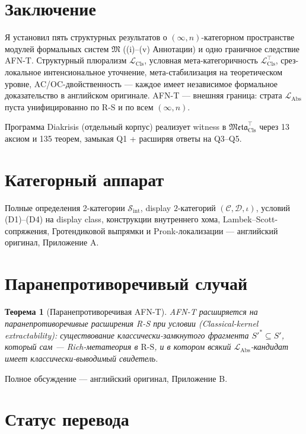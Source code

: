 \documentclass[11pt]{article}
\theoremstyle{plain}
\newtheorem{theorem}{Теорема}[section]
\theoremstyle{definition}
\newcommand{\RS}{\mathrm{R\text{-}S}}
\newcommand{\cS}{\mathcal{S}}
\newcommand{\cC}{\mathcal{C}}
\newcommand{\cD}{\mathcal{D}}
\newcommand{\fM}{\mathfrak{M}}
\newcommand{\Meta}{\mathfrak{Meta}}
\newcommand{\LCls}{\mathcal{L}_{\mathrm{Cls}}}
\newcommand{\LClsMax}{\mathcal{L}_{\mathrm{Cls}}^{\top}}
\newcommand{\LAbs}{\mathcal{L}_{\mathrm{Abs}}}
\newcommand{\Sint}{\cS_{\mathrm{int}}}
\begin{document}
\section{Заключение}\label{sec:conclusion}

Я установил пять структурных результатов о $(\infty, n)$-категорном пространстве модулей формальных систем $\fM$ ((i)--(v) Аннотации) и одно граничное следствие AFN-T. Структурный плюрализм $\LCls$, условная мета-категоричность $\LClsMax$, срез-локальное интенсиональное уточнение, мета-стабилизация на теоретическом уровне, AC/OC-двойственность — каждое имеет независимое формальное доказательство в английском оригинале. AFN-T — внешняя граница: страта $\LAbs$ пуста унифицированно по $\RS$ и по всем $(\infty, n)$.

Программа Diakrisis (отдельный корпус) реализует witness в $\Meta_{\mathrm{Cls}}^{\top}$ через 13 аксиом и 135 теорем, замыкая Q1 + расширяя ответы на Q3--Q5.

\appendix

\section{Категорный аппарат}\label{app:categorical}

Полные определения 2-категории $\Sint$, display $2$-категорий $(\cC, \cD, \iota)$, условий (D1)--(D4) на display class, конструкции внутреннего хома, Lambek--Scott-сопряжения, Гротендиковой выпрямки и Pronk-локализации — английский оригинал, Приложение A.

\section{Паранепротиворечивый случай}\label{app:paraconsistent}

\begin{theorem}[Паранепротиворечивая AFN-T]\label{thm:paraconsistent-afnt}
AFN-T расширяется на паранепротиворечивые расширения R-S при условии (Classical-kernel extractability): существование классически-замкнутого фрагмента $S'^* \subseteq S'$, который сам — Rich-метатеория в $\RS$, и в котором всякий $\LAbs$-кандидат имеет классически-выводимый свидетель.
\end{theorem}

Полное обсуждение — английский оригинал, Приложение B.

\section*{Статус перевода}
\end{document}
